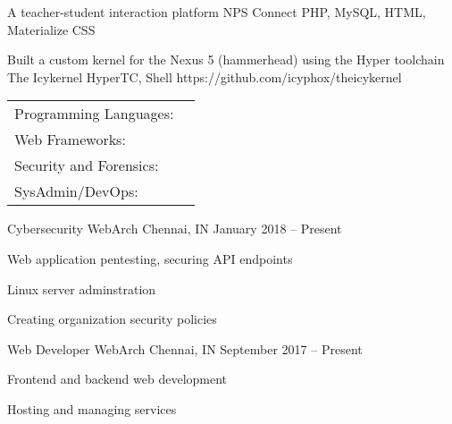 \documentclass[]{awesome-cv}
\begin{document}
\begin{multicols}{2}
\begin{cventries}
	\vspace{-5mm}
	\cventry
	{A teacher-student interaction platform}
	{NPS Connect}
	{PHP, MySQL, HTML, Materialize CSS}
	{}
	{}
	
	\vspace{-5mm}
	\cventry
	{Built a custom kernel for the Nexus 5 (hammerhead) using the Hyper toolchain}
	{The Icykernel}
	{HyperTC, Shell}
	{https://github.com/icyphox/theicykernel}
	{}
	
	\vspace{-5mm}
\end{cventries}
\begin{cventries}
	\cventry
	{}
	{\def\arraystretch{1.15}{\begin{tabular}{ l l }
		Programming Languages:  & {\skill{ Python, Shell, C/C++, JS, GNU/Octave, PHP, HTML/CSS}} \\
		Web Frameworks:  & {\skill{ Django, Angular2, Node.js, Ember,js, Vue.js, React, Hugo, Bootstrap, Materialize/MDL}} \\
		Security and Forensics:  & {\skill{ Metasploit Framework, SET, Autopsy, The Sleuth Kit, Encase, SIFT, Kali Linux toolset}} \\
		SysAdmin/DevOps:  & {\skill{ Unix tools/CLI, AWS, Digital Ocean, Git, TravisCI}} \\
		\end{tabular}}}
	{}
	{}
	{}
\end{cventries}

\vspace{-7mm}
\begin{cventries}
	\cventry
	{Cybersecurity}
	{WebArch}
	{Chennai, IN}
	{January 2018 – Present}
	{\begin{cvitems}
		\item {Web application pentesting, securing API endpoints}
		\item {Linux server adminstration}
		\item {Creating organization security policies}
		\end{cvitems}}
	\cventry
	{Web Developer}
	{WebArch}
	{Chennai, IN}
	{September 2017 – Present}
	{\begin{cvitems}
		\item {Frontend and backend web development}
		\item {Hosting and managing services}
		\end{cvitems}}
\end{cventries}
\end{multicols} 
\end{document}
